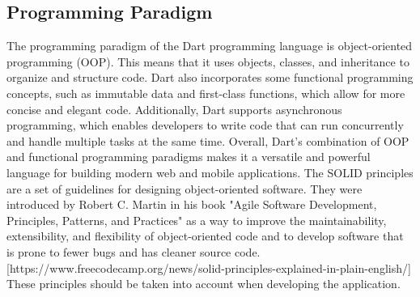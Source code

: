 \subsection{Programming Paradigm}
The programming paradigm of the Dart programming language is object-oriented programming (OOP). This means that it uses objects, classes, and inheritance to organize and structure code. Dart also incorporates some functional programming concepts, such as immutable data and first-class functions, which allow for more concise and elegant code. Additionally, Dart supports asynchronous programming, which enables developers to write code that can run concurrently and handle multiple tasks at the same time. Overall, Dart's combination of OOP and functional programming paradigms makes it a versatile and powerful language for building modern web and mobile applications. The SOLID principles are a set of guidelines for designing object-oriented software. They were introduced by Robert C. Martin in his book "Agile Software Development, Principles, Patterns, and Practices" as a way to improve the maintainability, extensibility, and flexibility of object-oriented code and to develop software that is prone to fewer bugs and has cleaner source code. [https://www.freecodecamp.org/news/solid-principles-explained-in-plain-english/] These principles should be taken into account when developing the application.
